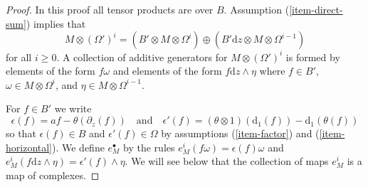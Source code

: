 \begin{proof}
In this proof all tensor products are over $B$.
Assumption (\ref{item-direct-sum}) implies that
$$
M \otimes (\Omega')^i =
(B' \otimes M \otimes \Omega^i)
\oplus
(B' \text{d}z \otimes M \otimes \Omega^{i - 1})
$$
for all $i \geq 0$. A collection of additive generators for
$M \otimes (\Omega')^i$ is formed by elements of the form
$f \omega$ and elements of the form $f \text{d}z \wedge \eta$
where $f \in B'$, $\omega \in M \otimes \Omega^i$, and
$\eta \in M \otimes \Omega^{i - 1}$.

\medskip\noindent
For $f \in B'$ we write
$$
\epsilon(f) = af - \theta(\partial_z(f))
\quad\text{and}\quad
\epsilon'(f) = (\theta \otimes 1)(\text{d}_1(f)) - \text{d}_1(\theta(f))
$$
so that $\epsilon(f) \in B$ and $\epsilon'(f) \in \Omega$ by
assumptions (\ref{item-factor}) and (\ref{item-horizontal}).
We define $e_M^\bullet$ by the rules
$e^i_M(f\omega) = \epsilon(f) \omega$ and
$e^i_M(f \text{d}z \wedge \eta) = \epsilon'(f) \wedge \eta$.
We will see below that the collection of maps $e^i_M$ is a map of complexes.


\end{proof}
